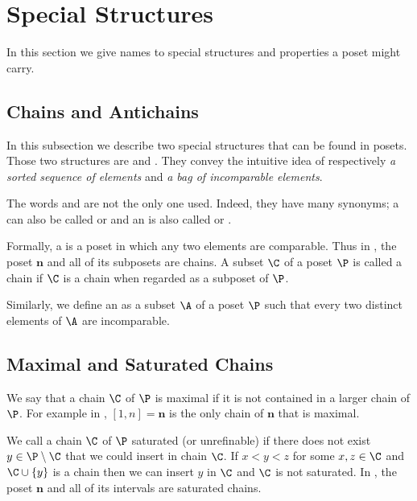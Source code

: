 \section{Special Structures}

In this section we give names to special structures and properties a poset
might carry.

\subsection{Chains and Antichains}

In this subsection we describe two special structures that can be found in
posets. Those two structures are  and .
They convey the intuitive idea of respectively \emph{a sorted sequence of
elements} and \emph{a bag of incomparable elements}.

The words  and  are not the only one used.
Indeed, they have many synonyms; a  can also be called
 or  and an
 is also called  or
.


Formally, a  is a poset in which any two elements are
comparable. Thus in , the poset $\bm{n}$ and all of its
subposets are chains. A subset $\C$ of a poset $\P$ is called a chain if $\C$ is a
chain when regarded as a subposet of $\P$.

Similarly, we define an  as a subset $\A$ of a poset $\P$ such
that every two distinct elements of $\A$ are incomparable.

\subsection{Maximal and Saturated Chains}

We say that a chain \(\C\) of \(\P\) is maximal if it is not contained in a larger
chain of $\P$. For example in , $[1, n] = \bm{n}$ is the
only chain of $\bm{n}$ that is maximal.

We call a chain $\C$ of $\P$ saturated (or unrefinable) if there does not exist
$y \in \P \setminus \C$ that we could insert in chain $\C$. If $x < y < z$ for
some $x, z \in \C$ and $\C \cup \left\{{y}\right\}$ is a chain then we can insert
$y$ in $\C$ and $\C$ is not saturated. In , the poset
$\bm{n}$ and all of its intervals are saturated chains.

